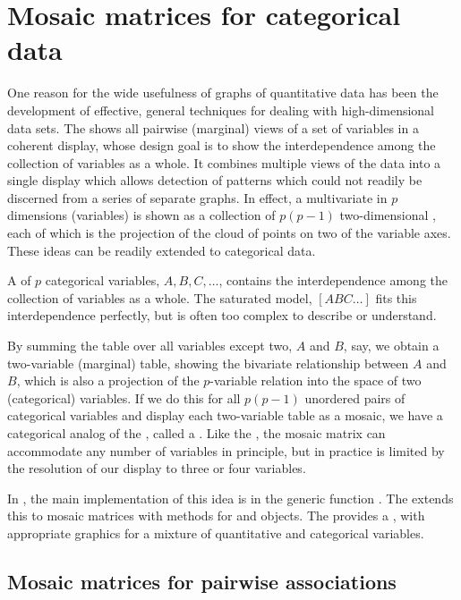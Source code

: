 \documentclass[10pt,krantz2]{krantz}\usepackage[]{graphicx}\usepackage[]{color}
\begin{document}
\section{Mosaic matrices for categorical data}\label{sec:mosmat}

One reason for the wide usefulness of graphs of quantitative data
has been the
development of effective, general techniques for dealing with
high-dimensional data sets.
The 
shows all pairwise (marginal) views of a set of variables
in a coherent display, whose design goal is to show the interdependence
among the collection of variables as a whole.
It combines multiple views of the data
into a single display which allows detection of patterns which could
not readily be discerned from a series of separate graphs.
In effect, a multivariate \Dset in $p$ dimensions (variables) is shown as
a collection of $p (p-1)$ two-dimensional \scats, each of which is
the projection of the cloud of points on two of the variable axes.
These ideas can be readily extended to categorical data.

A \mway \ctab of $p$ categorical variables,
$A, B, C,\dots$, contains the interdependence among the collection
of variables as a whole.  The saturated \loglin model, $[A B C\dots]$
fits this interdependence perfectly, but is often too complex to describe
or understand.

By summing the table over all variables except two,
$A$ and $B$, say, we obtain a two-variable (marginal) table, showing the
bivariate relationship between $A$ and $B$, which is also a projection
of the $p$-variable relation into the space of two (categorical) variables.
If we do this for all $p (p-1)$ unordered pairs of categorical variables
and display each two-variable table as a mosaic,  we have a categorical
analog of the \scatmat, called a
.
Like the \scatmat, the mosaic matrix can accommodate any number of
variables in principle, but in practice is limited by the resolution
of our display to three or four variables.

In \R, the main implementation of this idea is in the generic function
.  The  extends this to
mosaic matrices with methods
for  and  objects.
The  provides a ,
with appropriate graphics for a mixture of quantitative and categorical
variables.

\subsection{Mosaic matrices for pairwise associations}\label{sec:mosmatpairassoc}
\end{document}
